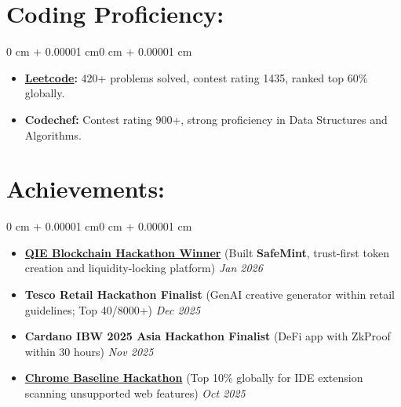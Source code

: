 \documentclass[1pt, letterpaper]{article}
\newenvironment{onecolentry}{
    \begin{adjustwidth}{0 cm + 0.00001 cm}{0 cm + 0.00001 cm}
}{\end{adjustwidth}}
\begin{document}
    \section{Coding Proficiency:}
    \begin{onecolentry}
        \begin{itemize}
            \item \textbf{\href{https://leetcode.com/u/madheshcode7/}{Leetcode}:} 420+ problems solved, contest rating 1435, ranked top 60\% globally. \vspace{-3pt}
            \item \textbf{Codechef:} Contest rating 900+, strong proficiency in Data Structures and Algorithms. \vspace{-3pt}
        \end{itemize}
    \end{onecolentry}

    \vspace{-0.5pt}

    \section{Achievements:}
    \begin{onecolentry}
        \begin{itemize}
            \item \textbf{\href{https://www.linkedin.com/feed/update/urn:li:activity:7426567594813464576/?rcm=ACoAAE75s30BtxiAeYQDdY0DUh39cPFwdczGKS8}{QIE Blockchain Hackathon Winner}} (Built \textbf{SafeMint}, trust-first token creation and liquidity-locking platform) \hfill \textit{Jan 2026}
            \item \textbf{Tesco Retail Hackathon Finalist} (GenAI creative generator within retail guidelines; Top 40/8000+) \hfill \textit{Dec 2025}
            \item \textbf{Cardano IBW 2025 Asia Hackathon Finalist} (DeFi app with ZkProof within 30 hours) \hfill \textit{Nov 2025}
            \item \textbf{\href{https://devpost.com/software/baseline-extension}{Chrome Baseline Hackathon}} (Top 10\% globally for IDE extension scanning unsupported web features) \hfill \textit{Oct 2025}
        \end{itemize}
    \end{onecolentry}

    \vspace{-0.5pt}
\end{document}

